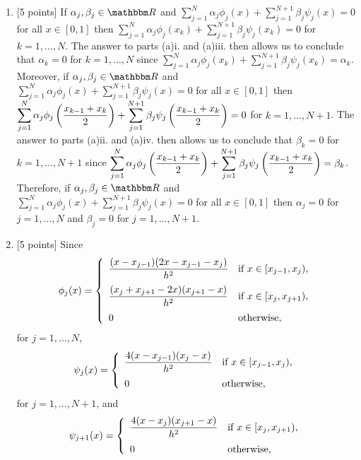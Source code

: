 \begin{solution}
\begin{enumerate}
\item {[5 points]} If $\alpha_j,\beta_j\in\R$ and $\displaystyle{\sum_{j=1}^N\alpha_j\phi_j\left(x\right)+\sum_{j=1}^{N+1}\beta_j\psi_j\left(x\right)=0}$ for all $x\in[0,1]$ then $\displaystyle{\sum_{j=1}^N\alpha_j\phi_j\left(x_k\right)+\sum_{j=1}^{N+1}\beta_j\psi_j\left(x_k\right)=0}$ for $k=1,\ldots,N$. The answer to parts (a)i. and (a)iii. then allows us to conclude that $\alpha_k=0$ for $k=1,\ldots,N$ since $\displaystyle{\sum_{j=1}^N\alpha_j\phi_j\left(x_k\right)+\sum_{j=1}^{N+1}\beta_j\psi_j\left(x_k\right)=\alpha_k}$. Moreover, if $\alpha_j,\beta_j\in\R$ and $\displaystyle{\sum_{j=1}^N\alpha_j\phi_j\left(x\right)+\sum_{j=1}^{N+1}\beta_j\psi_j\left(x\right)=0}$ for all $x\in[0,1]$ then $\displaystyle{\sum_{j=1}^N\alpha_j\phi_j\left({x_{k-1}+x_k \over 2}\right)+\sum_{j=1}^{N+1}\beta_j\psi_j\left({x_{k-1}+x_k \over 2}\right)=0}$ for $k=1,\ldots,N+1$. The answer to parts (a)ii. and (a)iv. then allows us to conclude that $\beta_k=0$ for $k=1,\ldots,N+1$ since $\displaystyle{\sum_{j=1}^N\alpha_j\phi_j\left({x_{k-1}+x_k \over 2}\right)+\sum_{j=1}^{N+1}\beta_j\psi_j\left({x_{k-1}+x_k \over 2}\right)=\beta_k}$. Therefore, if $\alpha_j,\beta_j\in\R$ and $\displaystyle{\sum_{j=1}^N\alpha_j\phi_j\left(x\right)+\sum_{j=1}^{N+1}\beta_j\psi_j\left(x\right)=0}$ for all $x\in[0,1]$ then $\alpha_j=0$ for $j=1,\ldots,N$ and $\beta_j=0$ for $j=1,\ldots,N+1$.
\\
\item {[5 points]} Since
\[
\phi_j(x)=\left\{\begin{array}{ll}
\displaystyle{{(x-x_{j-1})(2x-x_{j-1}-x_j) \over h^2}} & \displaystyle{\mbox{if }x\in[x_{j-1},x_j)},
\\[10pt]
\displaystyle{{(x_j+x_{j+1}-2x)(x_{j+1}-x) \over h^2}} & \displaystyle{\mbox{if }x\in[x_j,x_{j+1})},
\\[10pt]
0 & \mbox{otherwise},
\end{array}\right.
\]
for $j=1,\ldots,N$,
\[
\psi_j(x)=\left\{\begin{array}{ll}
\displaystyle{{4(x-x_{j-1})(x_j-x) \over h^2}} & \displaystyle{\mbox{if }x\in[x_{j-1},x_j)},
\\[10pt]
0 & \mbox{otherwise},
\end{array}\right.
\]
for $j=1,\ldots,N+1$, and
\[
\psi_{j+1}(x)=\left\{\begin{array}{ll}
\displaystyle{{4(x-x_j)(x_{j+1}-x) \over h^2}} & \displaystyle{\mbox{if }x\in[x_j,x_{j+1})},
\\[10pt]
0 & \mbox{otherwise},
\end{array}\right.
\]
\end{enumerate}
\end{solution}
